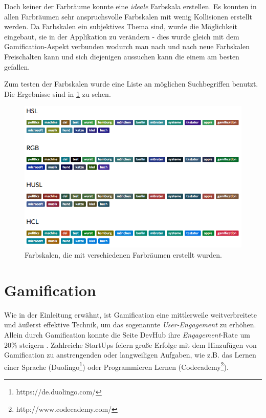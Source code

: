 \documentclass[12pt,twoside]{book}
\begin{document}
Doch keiner der Farbräume konnte eine \textit{ideale} Farbskala erstellen. Es konnten in allen Farbräumen sehr anspruchsvolle Farbskalen mit wenig Kollisionen erstellt werden. Da Farbskalen ein subjektives Thema sind, wurde die Möglichkeit eingebaut, sie in der Applikation zu verändern - dies wurde gleich mit dem Gamification-Aspekt verbunden wodurch man nach und nach neue Farbskalen Freischalten kann und sich diejenigen aussuchen kann die einem am besten gefallen.

Zum testen der Farbskalen wurde eine Liste an möglichen Suchbegriffen benutzt. Die Ergebnisse sind in \ref{fig:colors} zu sehen.

\begin{figure}[h]
    \centering
    \includegraphics[width=1.0\textwidth]{images/colors}
    \caption{Farbskalen, die mit verschiedenen Farbräumen erstellt wurden.}
    \label{fig:colors}
\end{figure}

\section{Gamification}

Wie in der Einleitung erwähnt, ist Gamification eine mittlerweile weitverbreitete und äußerst effektive Technik, um das sogenannte \textit{User-Engagement} zu erhöhen. Allein durch Gamification konnte die Seite DevHub ihre \textit{Engagement}-Rate um 20\% steigern \citep{zichermann2011gamification, 17}. Zahlreiche StartUps feiern große Erfolge mit dem Hinzufügen von Gamification zu anstrengenden oder langweiligen Aufgaben, wie z.B. das Lernen einer Sprache (Duolingo\footnote{https://de.duolingo.com/}) oder Programmieren Lernen (Codecademy\footnote{http://www.codecademy.com/}).
\end{document}
